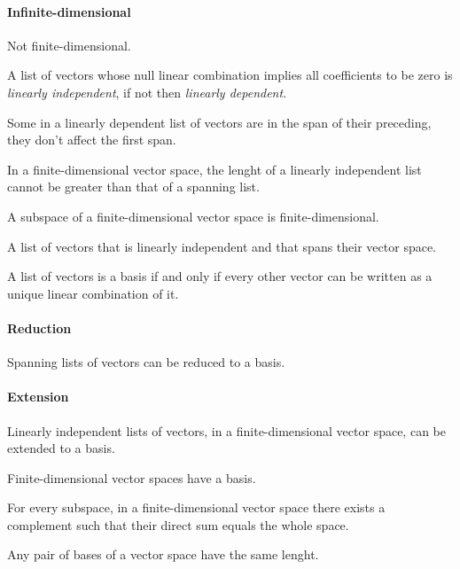 \begin{multicols}{3}
  \paragraph{\textbf{Infinite-dimensional}}
  Not finite-dimensional.
  
  A list of vectors whose null linear combination implies all coefficients to be zero is \textit{linearly independent},
  if not then \textit{linearly dependent}.

  Some in a linearly dependent list of vectors are in the span of their preceding, they don't affect the first span.
  
  In a finite-dimensional vector space, the lenght of a linearly independent list cannot be greater than that of a spanning list.
  
  A subspace of a finite-dimensional vector space is finite-dimensional.
  
  A list of vectors that is linearly independent and that spans their vector space.
  
  A list of vectors is a basis if and only if every other vector can be written as a unique linear combination of it.
  
  \paragraph{\textbf{Reduction}}
  Spanning lists of vectors can be reduced to a basis.
  \paragraph{\textbf{Extension}}
  Linearly independent lists of vectors, in a finite-dimensional vector space, can be extended to a basis.

  Finite-dimensional vector spaces have a basis.
  
  For every subspace, in a finite-dimensional vector space there exists a complement such that their direct sum equals the whole space.
  
  Any pair of bases of a vector space have the same lenght.
  

\end{multicols}

